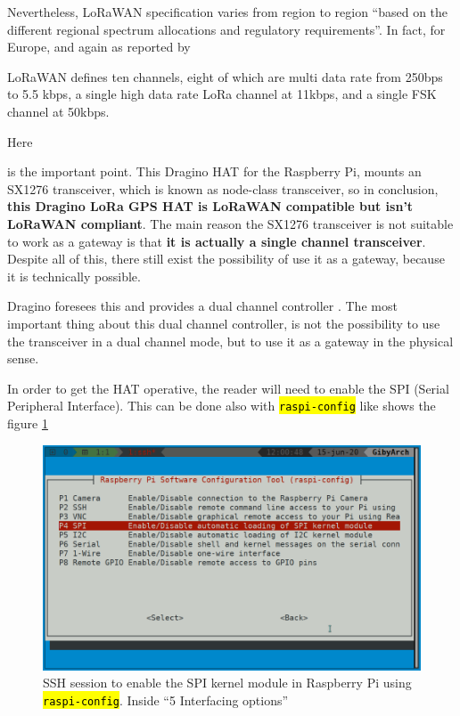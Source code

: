 \documentclass[11pt,a4paper,dvipsnames,twoside]{article}
\newcommand{\cmd}[1] {\hl{\texttt{#1}}}
\begin{document}
Nevertheless, LoRaWAN specification varies from region to region \enquote{based on
the different regional spectrum allocations and regulatory requirements}\cite[p.~12]{LoRaWANspec}. In fact, for Europe, and again as reported by \cite[p.~13]{LoRaWANspec} 

\begin{quoting}
LoRaWAN defines ten channels, eight of which are multi data rate from 250bps to
5.5 kbps, a single high data rate LoRa channel at 11kbps, and a single FSK channel
at 50kbps.
\end{quoting}

\hypertarget{Raspi_HAT}{Here} is the important point. This Dragino HAT for the Raspberry Pi, mounts an SX1276 transceiver, which is known as node-class transceiver, so in conclusion, \textbf{this Dragino LoRa GPS HAT is LoRaWAN compatible but isn't LoRaWAN compliant}. The main reason the SX1276 transceiver is not suitable to work as a gateway is that \textbf{it is actually a single channel transceiver}. Despite all of this, there still exist the possibility of use it as a gateway, because it is technically possible.


Dragino foresees this and provides a dual channel controller \cite{Dragino_DualChannelController_Rpi}. The most important thing about this dual channel controller, is not the possibility to use the transceiver in a dual channel mode, but to use it as a gateway in the physical sense.

In order to get the HAT operative, the reader will need to enable the SPI (Serial Peripheral Interface). This can be done also with \cmd{raspi-config} like shows the figure \ref{fig:EnablingSPI} 

\begin{figure}[ht]
  \centering
  \includegraphics[width=.9\textwidth]{../pictures/SPI_raspi-config.png}
  \caption{SSH session to enable the SPI kernel module in Raspberry Pi using \cmd{raspi-config}. Inside \enquote{5 Interfacing options}}
  \label{fig:EnablingSPI}
\end{figure}
\end{document}
